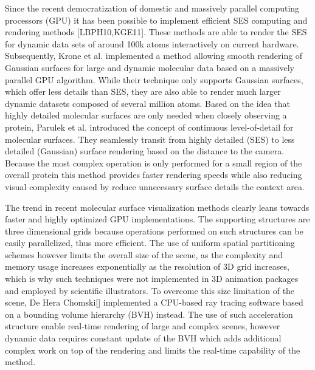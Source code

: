 Since the recent democratization of domestic and massively parallel computing processors (GPU) it has been possible to implement efficient SES computing and rendering methods [LBPH10,KGE11].
These methods are able to render the SES for dynamic data sets of around 100k atoms interactively on current hardware.
Subsequently, Krone et al. implemented a method allowing smooth rendering of Gaussian surfaces for large and dynamic molecular data based on a massively parallel GPU algorithm. 
While their technique only supports Gaussian surfaces, which offer less details than SES, they are also able to render much larger dynamic datasets composed of several million atoms.
Based on the idea that highly detailed molecular surfaces are only needed when closely observing a protein, Parulek et al. introduced the concept of continuous level-of-detail for molecular surfaces.
They seamlessly transit from highly detailed (SES) to less detailed (Gaussian) surface rendering based on the distance to the camera.
Because the most complex operation is only performed for a small region of the overall protein this method provides faster rendering speeds while also reducing visual complexity caused by reduce unnecessary surface details the context area.

The trend in recent molecular surface visualization methods clearly leans towards faster and highly optimized GPU implementations.
The supporting structures are three dimensional grids because operations performed on such structures can be easily parallelized, thus more efficient.
The use of uniform spatial partitioning schemes however limits the overall size of the scene, as the complexity and memory usage increases exponentially as the resolution of 3D grid increases, which is why such techniques were not implemented in 3D animation packages and employed by scientific illustrators.
To overcome this size limitation of the scene, De Hera Chomski[] implemented a CPU-based ray tracing software based on a bounding volume hierarchy (BVH) instead.
The use of such acceleration structure enable real-time rendering of large and complex scenes, however dynamic data requires constant update of the BVH which adds additional complex work on top of the rendering and limits the real-time capability of the method.


